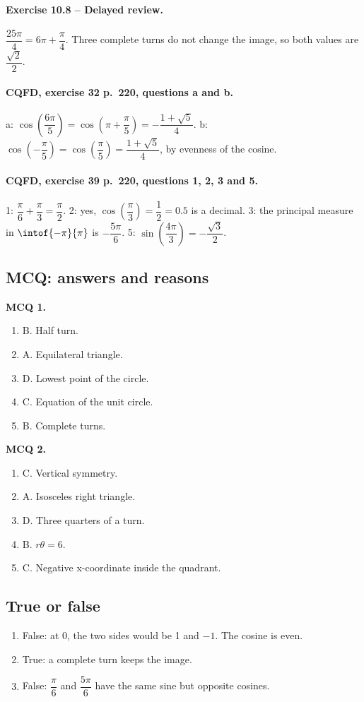 \paragraph{Exercise 10.8 -- Delayed review.} $\dfrac{25\pi}{4}=6\pi +\dfrac{\pi}{4}$. Three complete turns do not change the image, so both values are $\dfrac{\sqrt 2}{2}$.
\paragraph{CQFD, exercise 32 p.~220, questions a and b.} a: $\cos(\dfrac{6\pi}5)=\cos(\pi+\dfrac\pi5)=-\dfrac{1+\sqrt5}{4}$. b: $\cos(-\dfrac\pi5)=\cos(\dfrac\pi5)=\dfrac{1+\sqrt5}{4}$, by evenness of the cosine.
\paragraph{CQFD, exercise 39 p.~220, questions 1, 2, 3 and 5.} 1: $\dfrac\pi6+\dfrac\pi3=\dfrac\pi2$. 2: yes, $\cos(\dfrac\pi3)=\dfrac12=\num{0,5}$ is a decimal. 3: the principal measure in $\intof{-\pi}{\pi}$ is $-\dfrac{5\pi}6$. 5: $\sin(\dfrac{4\pi}3)=-\dfrac{\sqrt3}2$.
\subsection*{MCQ: answers and reasons}
\textbf{MCQ 1.}
\begin{enumerate}
\item B. Half turn.
\item A. Equilateral triangle.
\item D. Lowest point of the circle.
\item C. Equation of the unit circle.
\item B. Complete turns.
\end{enumerate}
\textbf{MCQ 2.}
\begin{enumerate}
\item C. Vertical symmetry.
\item A. Isosceles right triangle.
\item D. Three quarters of a turn.
\item B. $r\theta=6$.
\item C. Negative x-coordinate inside the quadrant.
\end{enumerate}
\subsection*{True or false}
\begin{enumerate}
\item False: at 0, the two sides would be 1 and $-1$. The cosine is even.
\item True: a complete turn keeps the image.
\item False: $\dfrac{\pi}{6}$ and $\dfrac{5\pi}{6}$ have the same sine but opposite cosines.
\end{enumerate}
